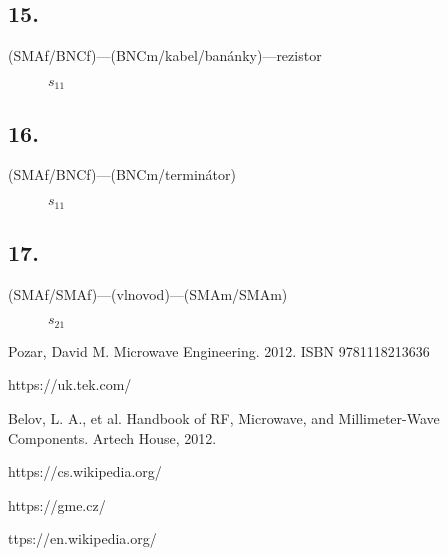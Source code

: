 \documentclass{protokol}
\begin{document}
\subsection{15.}
(SMAf/BNCf)---(BNCm/kabel/banánky)---rezistor

\begin{figure}[htp]
	\centering
	
	\caption{$s_{11}$}
	\label{fig:15-s11}
\end{figure}

\subsection{16.}
(SMAf/BNCf)---(BNCm/terminátor)

\begin{figure}[htp]
	\centering
	
	\caption{$s_{11}$}
	\label{fig:16-s11}
\end{figure}

\subsection{17.}
(SMAf/SMAf)---(vlnovod)---(SMAm/SMAm)

\begin{figure}[htp]
	\centering
	
	\caption{$s_{21}$}
	\label{fig:17-s21}
\end{figure}

\newpage
\begin{thebibliography}{}
	
	Pozar, David M. Microwave Engineering. 2012. ISBN 9781118213636
	
	https://uk.tek.com/
	
	Belov, L. A., et al. Handbook of RF, Microwave, and Millimeter-Wave Components. Artech House, 2012.
	
	https://cs.wikipedia.org/
	
	https://gme.cz/
	
	ttps://en.wikipedia.org/
	
\end{thebibliography}
\end{document}
